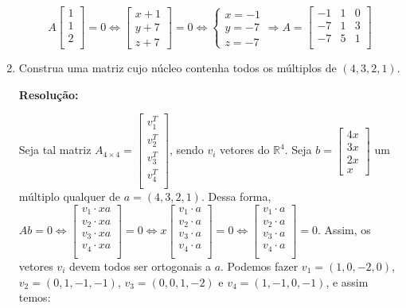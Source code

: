 \documentclass[leqno]{article}
\begin{document}
\begin{enumerate}
    $$A\begin{bmatrix}
    1\\
    1\\
    2\\
    \end{bmatrix}=0\iff \begin{bmatrix}
    x+1\\
    y+7\\
    z+7
    \end{bmatrix}=0\iff \begin{cases}x=-1\\
    y=-7\\
    z=-7\end{cases}\Rightarrow A=\begin{bmatrix}
    -1 & 1 & 0\\
    -7 & 1 & 3\\
    -7 & 5 & 1\\
    \end{bmatrix}$$
    
    \item Construa uma matriz cujo núcleo contenha todos os múltiplos de $(4,3,2,1)$.
    
    \textbf{Resolução:}
    
    Seja tal matriz $A_{4\times4} = \begin{bmatrix}
    v_1^T\\
    v_2^T\\
    v_3^T\\
    v_4^T\\
    \end{bmatrix}$, sendo $v_i$ vetores do $\mathbb{R}^4$. Seja $b=\begin{bmatrix}
    4x\\
    3x\\
    2x\\
    x
    \end{bmatrix}$ um múltiplo qualquer de $a=(4,3,2,1)$. Dessa forma, $Ab=0\iff \begin{bmatrix}
    v_1\cdot xa\\
    v_2\cdot xa\\
    v_3\cdot xa\\
    v_4\cdot xa\\
    \end{bmatrix}=0\iff x\begin{bmatrix}
    v_1\cdot a\\
    v_2\cdot a\\
    v_3\cdot a\\
    v_4\cdot a\\
    \end{bmatrix}=0\iff \begin{bmatrix}
    v_1\cdot a\\
    v_2\cdot a\\
    v_3\cdot a\\
    v_4\cdot a\\
    \end{bmatrix} = 0$. Assim, os vetores $v_i$ devem todos ser ortogonais a $a$. Podemos fazer $v_1 = (1,0,-2,0)$, $v_2 = (0,1,-1,-1)$, $v_3=(0,0,1,-2)$ e $v_4=(1,-1,0,-1)$, e assim temos:
    

\end{enumerate}
\end{document}

